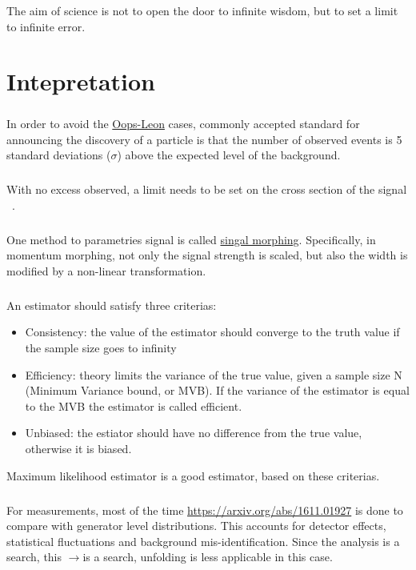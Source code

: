 \begin{savequote}[75mm]
The aim of science is not to open the door to infinite wisdom, but to set a limit to infinite error.
\end{savequote}

\chapter{Intepretation}

\paragraph{}
In order to avoid the \href{https://en.wikipedia.org/wiki/Oops-Leon}{Oops-Leon} cases, commonly accepted standard for announcing the discovery of a particle is that the number of observed events is 5 standard deviations ($\sigma$) above the expected level of the background.

\paragraph{}
With no excess observed, a limit needs to be set on the cross section of the signal ~\cite{Stat-asym}. 

\paragraph{}
One method to parametries signal is called \href{https://arxiv.org/abs/1410.7388}{singal morphing}. Specifically, in momentum morphing, not only the signal strength is scaled, but also the width is modified by a non-linear transformation. 

\paragraph{}
An estimator should satisfy three criterias:
\begin{itemize}
	\item Consistency: the value of the estimator should converge to the truth value if the sample size goes to infinity
	\item Efficiency: theory limits the variance of the true value, given a sample size N (Minimum Variance bound, or MVB). If the variance of the estimator is equal to the MVB the estimator is called efficient.
	\item Unbiased: the estiator should have no difference from the true value, otherwise it is biased.
\end{itemize}
Maximum likelihood estimator is a good estimator, based on these criterias.

\paragraph{}
For measurements, most of the time \href{unfolding}{https://arxiv.org/abs/1611.01927} is done to compare with generator level distributions. This accounts for detector effects, statistical fluctuations and background mis-identification. Since the analysis is a search, this \hh$\to$\fourb is a search, unfolding is less applicable in this case.